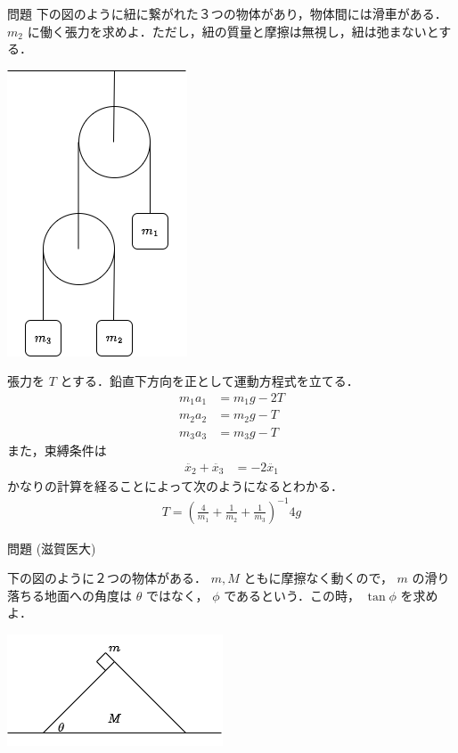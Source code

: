\documentclass[
  b4paperpaper,
  xelatex,ja=standard]{bxjsbook}
\begin{document}
\begin{Qbox}{問題}
下の図のように紐に繋がれた３つの物体があり，物体間には滑車がある．\(m_2\)
に働く張力を求めよ．ただし，紐の質量と摩擦は無視し，紐は弛まないとする．

\includegraphics{source/images/newton/newton13.png}

\end{Qbox}


張力を \(T\) とする．鉛直下方向を正として運動方程式を立てる．
\begin{align*}
m_1a_1&=m_1g-2T\\
m_2a_2&=m_2g-T\\
m_3a_3&=m_3g-T
\end{align*} また，束縛条件は \begin{align*}
\ddot{x_2}+\ddot{x_3}&=-2\ddot{x_1}
\end{align*} かなりの計算を経ることによって次のようになるとわかる．
\begin{align*}
T=\left(\frac{4}{m_1}+\frac{1}{m_2}+\frac{1}{m_3}\right)^{-1}4g
\end{align*}

\begin{Qbox}{問題}
(滋賀医大)

下の図のように２つの物体がある． \(m,M\) ともに摩擦なく動くので， \(m\)
の滑り落ちる地面への角度は \(\theta\) ではなく， \(\phi\)
であるという．この時， \(\tan \phi\) を求めよ．

\includegraphics{source/images/newton/newton14.png}

\end{Qbox}
\end{document}

